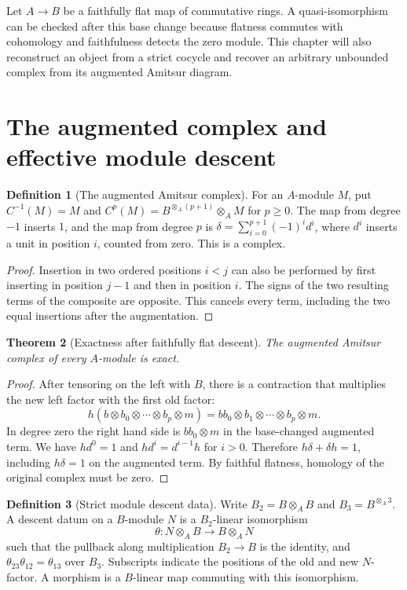 \documentclass[11pt,oneside,openany]{book}
\newtheorem{theorem}{Theorem}[chapter]
\theoremstyle{definition}
\newtheorem{definition}[theorem]{Definition}
\theoremstyle{remark}
\begin{document}
Let \(A\to B\) be a faithfully flat map of commutative rings. A
quasi-isomorphism can be checked after this base change because flatness
commutes with cohomology and faithfulness detects the zero module. This
chapter will also reconstruct an object from a strict cocycle and recover
an arbitrary unbounded complex from its augmented Amitsur diagram.

\section{The augmented complex and effective module descent}

\begin{definition}[The augmented Amitsur complex]\label{res:F01}
For an \(A\)-module \(M\), put \(C^{-1}(M)=M\) and
\(C^p(M)=B^{\otimes_A(p+1)}\otimes_A M\) for \(p\geq0\). The
map from degree \(-1\) inserts \(1\), and the map from degree \(p\)
is \(\delta=\sum_{i=0}^{p+1}(-1)^id^i\), where \(d^i\) inserts a
unit in position \(i\), counted from zero. This is a complex.
\end{definition}
\begin{proof}
Insertion in two ordered positions \(i<j\) can also be performed by
first inserting in position \(j-1\) and then in position \(i\).
The signs of the two resulting terms of the composite are opposite.
This cancels every term, including the two equal insertions after the
augmentation.
\end{proof}

\begin{theorem}[Exactness after faithfully flat descent]\label{res:F02}
The augmented Amitsur complex of every \(A\)-module is exact.
\end{theorem}
\begin{proof}
After tensoring on the left with \(B\), there is a contraction that
multiplies the new left factor with the first old factor:
\[
 h(b\otimes b_0\otimes\cdots\otimes b_p\otimes m)
   =bb_0\otimes b_1\otimes\cdots\otimes b_p\otimes m .
\]
In degree zero the right hand side is \(bb_0\otimes m\) in the
base-changed augmented term. We have \(hd^0=1\) and
\(hd^i=d^{i-1}h\) for \(i>0\). Therefore
\(h\delta+\delta h=1\), including \(h\delta=1\) on the augmented
term. By faithful flatness, homology of the original complex
must be zero.
\end{proof}

\begin{definition}[Strict module descent data]\label{res:F03}
Write \(B_2=B\otimes_A B\) and \(B_3=B^{\otimes_A3}\). A descent
datum on a \(B\)-module \(N\) is a \(B_2\)-linear isomorphism
\[
 \theta:N\otimes_A B\longrightarrow B\otimes_A N
\]
such that the pullback along multiplication \(B_2\to B\) is the
identity, and \(\theta_{23}\theta_{12}=\theta_{13}\) over \(B_3\).
Subscripts indicate the positions of the old and new \(N\)-factor.
A morphism is a \(B\)-linear map commuting with this isomorphism.
\end{definition}
\end{document}

